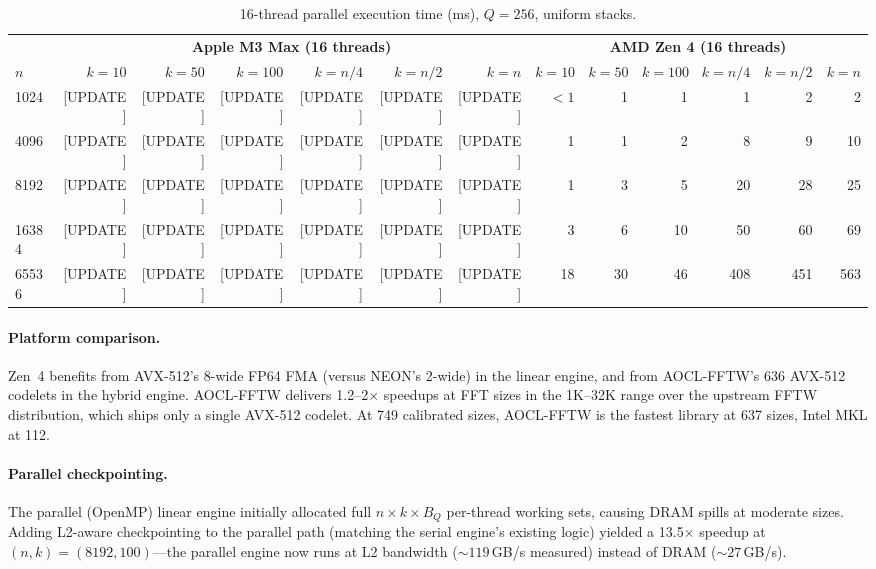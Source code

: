 \documentclass[11pt]{article}
\begin{document}
\begin{table}[t]
\centering
\caption{16-thread parallel execution time (ms), $Q = 256$, uniform stacks.}
\label{tab:parallel}
\begin{tabular}{@{}l rrrrrr rrrrrr@{}}
\toprule
& \multicolumn{6}{c}{\textbf{Apple M3 Max (16 threads)}} &
  \multicolumn{6}{c}{\textbf{AMD Zen 4 (16 threads)}} \\
\cmidrule(lr){2-7} \cmidrule(lr){8-13}
$n$ & $k{=}10$ & $k{=}50$ & $k{=}100$ & $k{=}n/4$ & $k{=}n/2$ & $k{=}n$
    & $k{=}10$ & $k{=}50$ & $k{=}100$ & $k{=}n/4$ & $k{=}n/2$ & $k{=}n$ \\
\midrule
1024  & [UPDATE] & [UPDATE] & [UPDATE] & [UPDATE] & [UPDATE] & [UPDATE]
      & ${<}1$ & 1 & 1 & 1 & 2 & 2 \\
4096  & [UPDATE] & [UPDATE] & [UPDATE] & [UPDATE] & [UPDATE] & [UPDATE]
      & 1 & 1 & 2 & 8 & 9 & 10 \\
8192  & [UPDATE] & [UPDATE] & [UPDATE] & [UPDATE] & [UPDATE] & [UPDATE]
      & 1 & 3 & 5 & 20 & 28 & 25 \\
16384 & [UPDATE] & [UPDATE] & [UPDATE] & [UPDATE] & [UPDATE] & [UPDATE]
      & 3 & 6 & 10 & 50 & 60 & 69 \\
65536 & [UPDATE] & [UPDATE] & [UPDATE] & [UPDATE] & [UPDATE] & [UPDATE]
      & 18 & 30 & 46 & 408 & 451 & 563 \\
\bottomrule
\end{tabular}
\end{table}

\paragraph{Platform comparison.}
Zen~4 benefits from AVX-512's 8-wide FP64 FMA (versus NEON's 2-wide) in
the linear engine, and from AOCL-FFTW's 636 AVX-512 codelets in the
hybrid engine. AOCL-FFTW delivers 1.2--2$\times$ speedups at FFT sizes
in the 1K--32K range over the upstream FFTW distribution, which ships only
a single AVX-512 codelet. At 749 calibrated sizes, AOCL-FFTW is
the fastest library at 637 sizes, Intel MKL at 112.

\paragraph{Parallel checkpointing.}
The parallel (OpenMP) linear engine initially allocated full
$n \times k \times B_Q$ per-thread working sets, causing DRAM spills at
moderate sizes. Adding L2-aware checkpointing to the parallel path
(matching the serial engine's existing logic) yielded a 13.5$\times$
speedup at $(n, k) = (8192, 100)$---the parallel engine now runs at
L2 bandwidth (${\sim}119$\,GB/s measured) instead of DRAM
(${\sim}27$\,GB/s).
\end{document}
